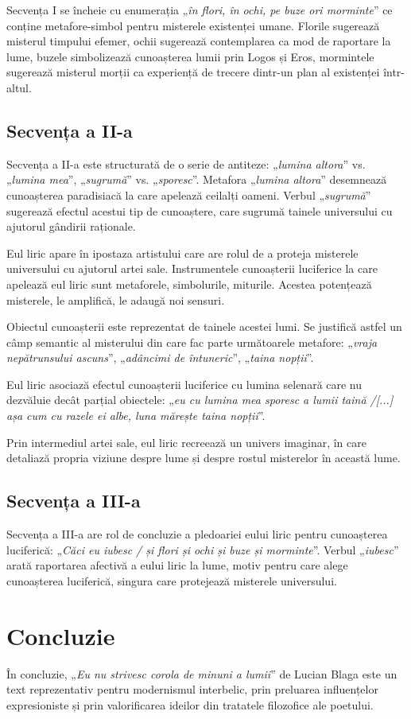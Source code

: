 \documentclass{article}
\newcommand{\qu}[1]{„\emph{#1}”}
\begin{document}
Secvența I se încheie cu enumerația \qu{în flori, în ochi, pe buze ori morminte} ce conține metafore-simbol pentru misterele existenței umane. Florile sugerează misterul timpului efemer, ochii sugerează contemplarea ca mod de raportare la lume, buzele simbolizează cunoașterea lumii prin Logos și Eros, mormintele sugerează misterul morții ca experiență de trecere dintr-un plan al existenței într-altul.

\subsection{Secvența a II-a}
Secvența a II-a este structurată de o serie de antiteze: \qu{lumina altora} vs. \qu{lumina mea}, \qu{sugrumă} vs. \qu{sporesc}. Metafora \qu{lumina altora} desemnează cunoașterea paradisiacă la care apelează ceilalți oameni. Verbul \qu{sugrumă} sugerează efectul acestui tip de cunoaștere, care sugrumă tainele universului cu ajutorul gândirii raționale.

Eul liric apare în ipostaza artistului care are rolul de a proteja misterele universului cu ajutorul artei sale. Instrumentele cunoașterii luciferice la care apelează eul liric sunt metaforele, simbolurile, miturile. Acestea potențează misterele, le amplifică, le adaugă noi sensuri.

Obiectul cunoașterii este reprezentat de tainele acestei lumi. Se justifică astfel un câmp semantic al misterului din care fac parte următoarele metafore: \qu{vraja nepătrunsului ascuns}, \qu{adâncimi de întuneric}, \qu{taina nopții}.

Eul liric asociază efectul cunoașterii luciferice cu lumina selenară care nu dezvăluie decât parțial obiectele: \qu{eu cu lumina mea sporesc a lumii taină /[...] așa cum cu razele ei albe, luna mărește taina nopții}.

Prin intermediul artei sale, eul liric recreează un univers imaginar, în care detaliază propria viziune despre lume și despre rostul misterelor în această lume.

\subsection{Secvența a III-a}
Secvența a III-a are rol de concluzie a pledoariei eului liric pentru cunoașterea luciferică: \qu{Căci eu iubesc / și flori și ochi și buze și morminte}. Verbul \qu{iubesc} arată raportarea afectivă a eului liric la lume, motiv pentru care alege cunoașterea luciferică, singura care protejează misterele universului.

\section{Concluzie}
În concluzie, \qu{Eu nu strivesc corola de minuni a lumii} de Lucian Blaga este un text reprezentativ pentru modernismul interbelic, prin preluarea influențelor expresioniste și prin valorificarea ideilor din tratatele filozofice ale poetului.
\end{document}
